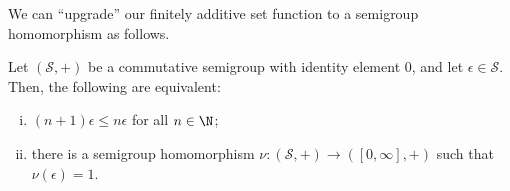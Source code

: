We can ``upgrade'' our finitely additive set function to a semigroup homomorphism as follows.
\begin{theorem}\label{thm:homomorphism_existence}
  Let $\left(\mathcal{S},+\right)$ be a commutative semigroup with identity element $0$, and let $\epsilon\in \mathcal{S}$. Then, the following are equivalent:
  \begin{enumerate}[(i)]
    \item $\left(n+1\right)\epsilon \leq n\epsilon$ for all $n\in \N$;
    \item there is a semigroup homomorphism $\nu\colon \left(\mathcal{S},+\right)\rightarrow \left([0,\infty],+\right)$ such that $\nu(\epsilon) = 1$.
  \end{enumerate}
\end{theorem}
